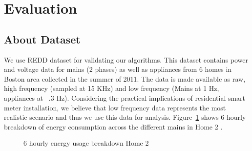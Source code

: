 \documentclass[conference]{IEEEtran}
\newcommand{\figref}[1]{Figure~\ref{#1}}
\begin{document}
\section{Evaluation}
\subsection{About Dataset}

We use REDD dataset \cite{redd} for validating our algorithms. This dataset contains power and voltage data for mains (2 phases) as well as appliances from 6 homes in Boston area collected in the summer of 2011. The data is made available as raw, high frequency (sampled at 15 KHz) and low frequency (Mains at 1 Hz, appliances at ~.3 Hz). Considering the practical implications of residential smart meter installation, we believe that low frequency data represents the most realistic scenario and thus we use this data for analysis. \figref{fig:breakdown} shows 6 hourly breakdown of energy consumption across the different mains in Home 2 .


\begin{figure} 
	
  	\caption{6 hourly energy usage breakdown Home 2}
    \label{fig:breakdown}
\end{figure}
\end{document}
